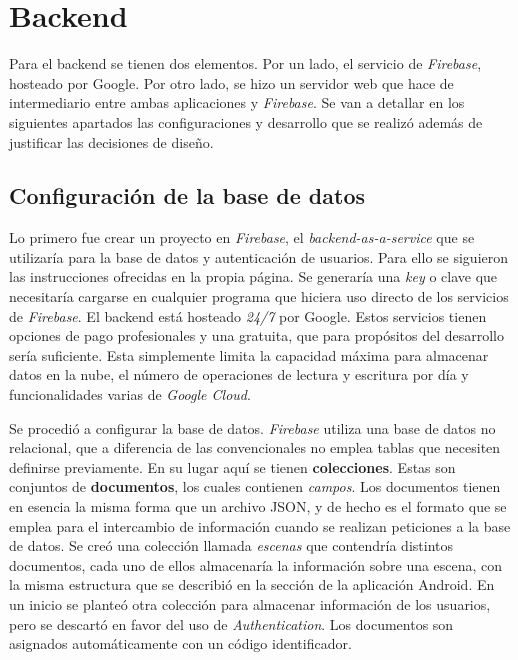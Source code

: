 \section{Backend}

Para el backend se tienen dos elementos. Por un lado, el servicio de \textit{Firebase}, hosteado por Google. Por otro lado, se hizo un servidor web que hace de intermediario entre ambas aplicaciones y \textit{Firebase}. Se van a detallar en los siguientes apartados las configuraciones y desarrollo que se realizó además de justificar las decisiones de diseño.

\subsection{Configuración de la base de datos}

Lo primero fue crear un proyecto en \textit{Firebase}, el \textit{backend-as-a-service} que se utilizaría para la base de datos y autenticación de usuarios. Para ello se siguieron las instrucciones ofrecidas en la propia página. Se generaría una \textit{key} o clave que necesitaría cargarse en cualquier programa que hiciera uso directo de los servicios de \textit{Firebase}. El backend está hosteado \textit{24/7} por Google. Estos servicios tienen opciones de pago profesionales y una gratuita, que para propósitos del desarrollo sería suficiente. Esta simplemente limita la capacidad máxima para almacenar datos en la nube, el número de operaciones de lectura y escritura por día y funcionalidades varias de \textit{Google Cloud}.

Se procedió a configurar la base de datos. \textit{Firebase} utiliza una base de datos no relacional, que a diferencia de las convencionales no emplea tablas que necesiten definirse previamente. En su lugar aquí se tienen \textbf{colecciones}. Estas son conjuntos de \textbf{documentos}, los cuales contienen \textit{campos}. Los documentos tienen en esencia la misma forma que un archivo JSON, y de hecho es el formato que se emplea para el intercambio de información cuando se realizan peticiones a la base de datos. Se creó una colección llamada \textit{escenas} que contendría distintos documentos, cada uno de ellos almacenaría la información sobre una escena, con la misma estructura que se describió en la sección de la aplicación Android. En un inicio se planteó otra colección para almacenar información de los usuarios, pero se descartó en favor del uso de \textit{Authentication}. Los documentos son asignados automáticamente con un código identificador.

